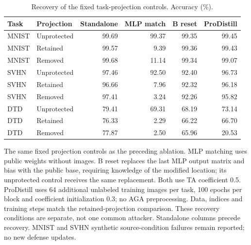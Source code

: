 \begin{table}[t]
\centering\small
\setlength{\tabcolsep}{4pt}
\caption{Recovery of the fixed task-projection controls. Accuracy (\%).}
\label{tab:defense2_projection_recovery}
\begin{tabular}{@{}llrrrr@{}}
\toprule
Task & Projection & Standalone & MLP match & B reset & ProDistill \\
\midrule
MNIST & Unprotected & 99.69 & 99.37 & 99.35 & 99.45 \\
MNIST & Retained & 99.57 & 9.39 & 99.36 & 99.43 \\
MNIST & Removed & 99.68 & 11.14 & 99.34 & 99.07 \\
\midrule
SVHN & Unprotected & 97.46 & 92.50 & 92.40 & 96.73 \\
SVHN & Retained & 96.66 & 7.96 & 92.32 & 96.18 \\
SVHN & Removed & 97.41 & 3.24 & 92.26 & 95.82 \\
\midrule
DTD & Unprotected & 79.41 & 69.31 & 68.19 & 73.14 \\
DTD & Retained & 76.33 & 2.29 & 66.22 & 66.70 \\
DTD & Removed & 77.87 & 2.50 & 65.96 & 20.53 \\
\bottomrule
\end{tabular}
\par\smallskip
\begin{minipage}{\textwidth}\footnotesize The same fixed projection controls as the preceding ablation. MLP matching uses public weights without images. B reset replaces the last MLP output matrix and bias with the public base, requiring knowledge of the modified location; its unprotected control receives the same replacement. Both use TA coefficient 0.5. ProDistill uses 64 additional unlabeled training images per task, 100 epochs per block and coefficient initialization 0.3; no AGA preprocessing. Data, indices and training steps match the retained-projection comparison. These recovery conditions are separate, not one common attacker. Standalone columns precede recovery. MNIST and SVHN synthetic source-condition failures remain reported; no new defense updates.\end{minipage}
\end{table}
